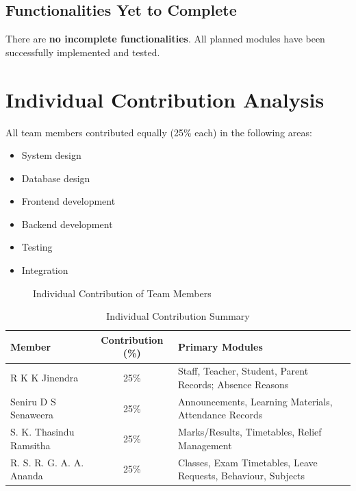 \documentclass[12pt, a4paper]{report}
\begin{document}
\section{Functionalities Yet to Complete}

There are \textbf{no incomplete functionalities}. All planned modules have been successfully implemented and tested.

\chapter{Individual Contribution Analysis}

All team members contributed equally (25\% each) in the following areas:

\begin{itemize}
    \item System design
    \item Database design
    \item Frontend development
    \item Backend development
    \item Testing
    \item Integration
\end{itemize}

\begin{figure}[H]
    \centering
    \caption{Individual Contribution of Team Members}
    \label{fig:contribution-pie}
\end{figure}

\begin{table}[H]
\centering
\caption{Individual Contribution Summary}
\label{tab:contribution}
\begin{tabularx}{\textwidth}{l c >{\raggedright\arraybackslash}X}
\toprule
\textbf{Member} & \textbf{Contribution (\%)} & \textbf{Primary Modules} \\
\midrule
R K K Jinendra  & 25\% & Staff, Teacher, Student, Parent Records; Absence Reasons \\
Seniru D S Senaweera  & 25\% & Announcements, Learning Materials, Attendance Records \\
S. K. Thasindu Ramsitha & 25\% & Marks/Results, Timetables, Relief Management \\
R. S. R. G. A. A. Ananda  & 25\% & Classes, Exam Timetables, Leave Requests, Behaviour, Subjects \\
\bottomrule
\end{tabularx}
\end{table}
\end{document}

